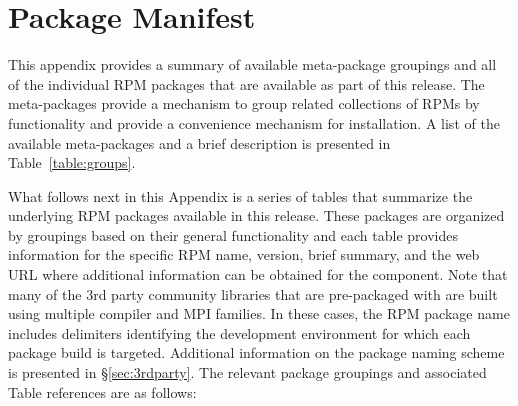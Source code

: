 \clearpage

\newcommand{\captionSpace}{-0.15cm}
\newcommand{\tabSpaceBot}{1.0cm}
\captionsetup{justification=raggedright,singlelinecheck=false}

\section{Package Manifest} \label {appendix:manifest}

This appendix provides a summary of available meta-package groupings and all of
the individual RPM packages that are available as part of this \OHPC{}
release. The meta-packages provide a mechanism to group related collections of
RPMs by functionality and provide a convenience mechanism for installation.  A
list of the available meta-packages and a brief description is presented in
Table~\ref{table:groups}.

\begin{table}[h!]
\caption{\bf Available \OHPC{} Meta-packages}
\label{table:groups}

\end{table}


\begin{table}[h!]
\caption*{Table~\ref{table:groups} (cont): {\bf Available \OHPC{} Meta-packages} }

\end{table}

\fi

\clearpage
What follows next in this Appendix is a series of tables that summarize the
underlying RPM packages available in this \OHPC{} release. These packages are
organized by groupings based on their general functionality and each table
provides information for the specific RPM name, version, brief summary, and the
web URL where additional information can be obtained for the component. Note
that many of the 3rd party community libraries that are pre-packaged
with \OHPC{} are built using multiple compiler and MPI families. In these cases,
the RPM package name includes delimiters identifying the development
environment for which each package build is targeted.  Additional information
on the \OHPC{} package naming scheme is presented in \S\ref{sec:3rdparty}.
The relevant package groupings and associated Table references are as follows:

